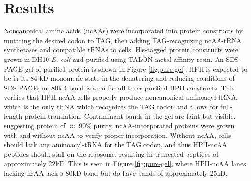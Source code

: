 \documentclass[journal=jacsat,manuscript=article]{achemso}
\begin{document}
\section{Results}
Noncanonical amino acids (ncAAs) were incorporated into protein constructs by mutating the desired codon to TAG, then adding TAG-recognizing ncAA-tRNA synthetases and compatible tRNAs to cells. His-tagged protein constructs were grown in DH10 \textit{E. coli} and purified using TALON metal affinity resin. An SDS-PAGE gel of purified protein is shown in Figure \ref{fig:pure-gel}. HPII is expected to be in its 84-kD monomeric state in the denaturing and reducing conditions of SDS-PAGE; an 80kD band is seen for all three purified HPII constructs. This verifies that HPII-ncAA cells properly produce noncanonical aminoacyl-tRNA, which is the only tRNA which recognizes the TAG codon and allows for full-length protein translation. Contaminant bands in the gel are faint but visible, suggesting protein of $\approx$ 90\% purity. ncAA-incorporated proteins were grown with and without ncAA to verify proper incorporation. Without ncAA, cells should lack any aminoacyl-tRNA for the TAG codon, and thus HPII-ncAA peptides should stall on the ribosome, resulting in truncated peptides of approximately 22kD. This is seen in Figure \ref{fig:pure-gel}, where HPII-ncAA lanes lacking ncAA lack a 80kD band but do have bands of approximately 25kD.\\
\end{document}
